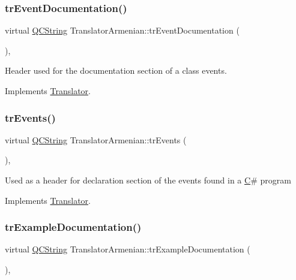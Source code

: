 \subsubsection{\texorpdfstring{trEventDocumentation()}{trEventDocumentation()}}
{\footnotesize\ttfamily virtual \mbox{\hyperlink{class_q_c_string}{Q\+C\+String}} Translator\+Armenian\+::tr\+Event\+Documentation (\begin{DoxyParamCaption}{ }\end{DoxyParamCaption})\hspace{0.3cm}{\ttfamily [inline]}, {\ttfamily [virtual]}}

Header used for the documentation section of a class\textquotesingle{} events. 

Implements \mbox{\hyperlink{class_translator}{Translator}}.

\mbox{\label{class_translator_armenian_a6b3fcd2aad93f88b77aa71ab75be68fe}} 
\subsubsection{\texorpdfstring{trEvents()}{trEvents()}}
{\footnotesize\ttfamily virtual \mbox{\hyperlink{class_q_c_string}{Q\+C\+String}} Translator\+Armenian\+::tr\+Events (\begin{DoxyParamCaption}{ }\end{DoxyParamCaption})\hspace{0.3cm}{\ttfamily [inline]}, {\ttfamily [virtual]}}

Used as a header for declaration section of the events found in a \mbox{\hyperlink{class_c}{C}}\# program 

Implements \mbox{\hyperlink{class_translator}{Translator}}.

\mbox{\label{class_translator_armenian_aa211e5d3e8eeed88f15735a6208f15f3}} 
\subsubsection{\texorpdfstring{trExampleDocumentation()}{trExampleDocumentation()}}
{\footnotesize\ttfamily virtual \mbox{\hyperlink{class_q_c_string}{Q\+C\+String}} Translator\+Armenian\+::tr\+Example\+Documentation (\begin{DoxyParamCaption}{ }\end{DoxyParamCaption})\hspace{0.3cm}{\ttfamily [inline]}, {\ttfamily [virtual]}}

